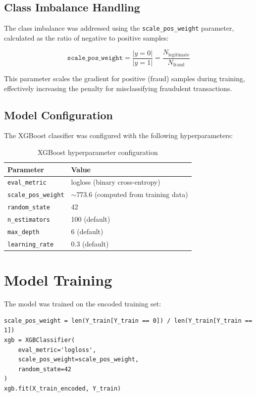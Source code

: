 \documentclass[12pt,a4paper]{report}
\begin{document}
\subsection{Class Imbalance Handling}

The class imbalance was addressed using the \texttt{scale\_pos\_weight} parameter, calculated as the ratio of negative to positive samples:

\begin{equation}
    \texttt{scale\_pos\_weight} = \frac{|y = 0|}{|y = 1|} = \frac{N_{\text{legitimate}}}{N_{\text{fraud}}}
\end{equation}

This parameter scales the gradient for positive (fraud) samples during training, effectively increasing the penalty for misclassifying fraudulent transactions.

\subsection{Model Configuration}

The XGBoost classifier was configured with the following hyperparameters:

\begin{table}[h!]
\centering
\caption{XGBoost hyperparameter configuration}
\label{tab:hyperparams}
\begin{tabular}{@{}ll@{}}
\toprule
\textbf{Parameter} & \textbf{Value} \\
\midrule
\texttt{eval\_metric} & logloss (binary cross-entropy) \\
\texttt{scale\_pos\_weight} & $\sim$773.6 (computed from training data) \\
\texttt{random\_state} & 42 \\
\texttt{n\_estimators} & 100 (default) \\
\texttt{max\_depth} & 6 (default) \\
\texttt{learning\_rate} & 0.3 (default) \\
\bottomrule
\end{tabular}
\end{table}

\section{Model Training}

The model was trained on the encoded training set:

\begin{lstlisting}[caption={Model training}]
scale_pos_weight = len(Y_train[Y_train == 0]) / len(Y_train[Y_train == 1])
xgb = XGBClassifier(
    eval_metric='logloss',
    scale_pos_weight=scale_pos_weight,
    random_state=42
)
xgb.fit(X_train_encoded, Y_train)
\end{lstlisting}
\end{document}
